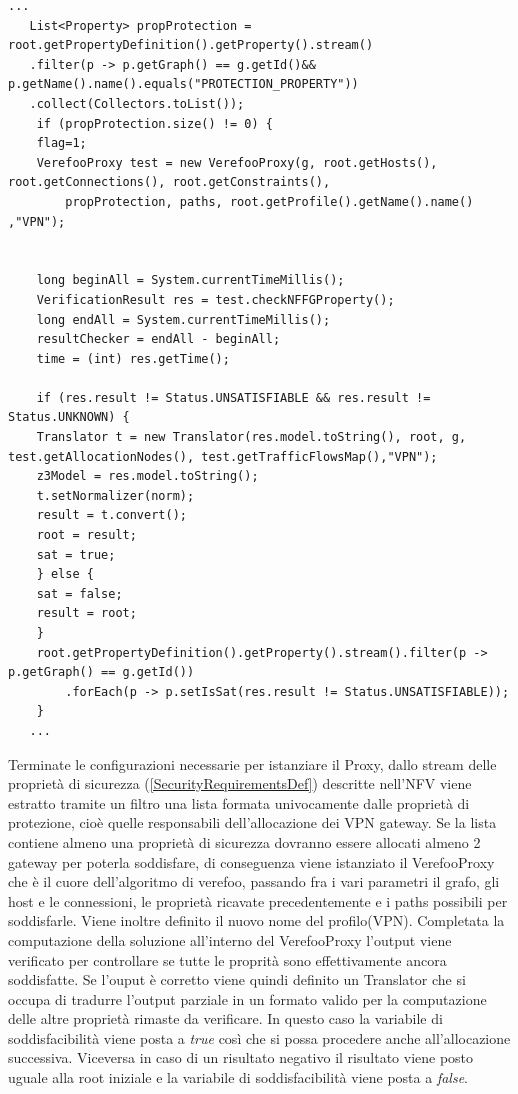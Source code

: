 \newpage


\begin{lstlisting}[caption={Iterazione di allocazione VPN}, label=lst:java_example3]
   ... 
   List<Property> propProtection = root.getPropertyDefinition().getProperty().stream()
   .filter(p -> p.getGraph() == g.getId()&& p.getName().name().equals("PROTECTION_PROPERTY"))
   .collect(Collectors.toList());
    if (propProtection.size() != 0) {
    flag=1;
    VerefooProxy test = new VerefooProxy(g, root.getHosts(), root.getConnections(), root.getConstraints(),
        propProtection, paths, root.getProfile().getName().name() ,"VPN");

    
    long beginAll = System.currentTimeMillis();
    VerificationResult res = test.checkNFFGProperty();
    long endAll = System.currentTimeMillis();
    resultChecker = endAll - beginAll;
    time = (int) res.getTime();

    if (res.result != Status.UNSATISFIABLE && res.result != Status.UNKNOWN) {
    Translator t = new Translator(res.model.toString(), root, g, test.getAllocationNodes(), test.getTrafficFlowsMap(),"VPN");
    z3Model = res.model.toString();
    t.setNormalizer(norm);
    result = t.convert();
    root = result;
    sat = true;
    } else {
    sat = false;
    result = root;
    }
    root.getPropertyDefinition().getProperty().stream().filter(p -> p.getGraph() == g.getId())
        .forEach(p -> p.setIsSat(res.result != Status.UNSATISFIABLE));
    }
   ...
\end{lstlisting}

Terminate le configurazioni necessarie per istanziare il Proxy, dallo stream delle proprietà di sicurezza (\ref{SecurityRequirementsDef}) descritte nell'NFV
viene estratto tramite un filtro una lista formata univocamente dalle proprietà di protezione, cioè quelle responsabili dell'allocazione dei VPN gateway. Se la lista contiene 
almeno una proprietà di sicurezza dovranno essere allocati almeno 2 gateway per poterla soddisfare, di conseguenza viene istanziato il VerefooProxy che è il cuore dell'algoritmo
di verefoo, passando fra i vari parametri il grafo, gli host e le connessioni, le proprietà ricavate precedentemente e i paths possibili per soddisfarle. Viene inoltre definito il
nuovo nome del profilo(VPN). Completata la computazione della soluzione all'interno del VerefooProxy l'output viene verificato per controllare se tutte le proprità sono effettivamente
ancora soddisfatte. Se l'ouput è corretto viene quindi definito un Translator che si occupa di tradurre l'output parziale in un formato valido per la computazione delle altre proprietà
rimaste da verificare. In questo caso la variabile di soddisfacibilità viene posta a \textit{true} così che si possa procedere anche all'allocazione successiva. Viceversa in caso di un risultato  
negativo il risultato viene posto uguale alla root iniziale e la variabile di soddisfacibilità viene posta a \textit{false}.


